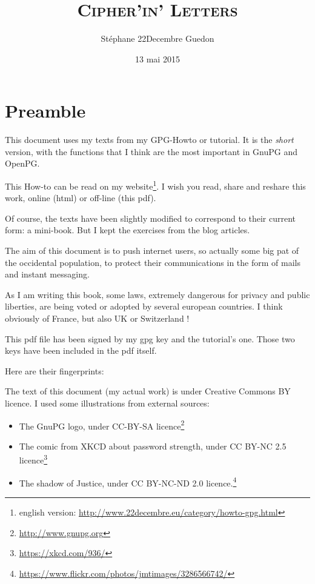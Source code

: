 \documentclass[10pt,a4paper,openany]{book}
\title{\scshape Cipher'in' Letters}
\author{Stéphane 22Decembre Guedon}
\date{13 mai 2015}
\begin{document}
	\maketitle

	\chapter{Preamble}
	
	This document uses my texts from my GPG-Howto or tutorial. It is the \textit{short} version, with the functions that I think are the most important in GnuPG and OpenPG.
	
	This How-to can be read on my website\footnote{english version: \url{http://www.22decembre.eu/category/howto-gpg.html}}. I wish you read, share and reshare this work, online (html) or off-line (this pdf).
	
	Of course, the texts have been slightly modified to correspond to their current form: a mini-book. But I kept the exercises from the blog articles.
	
	The aim of this document is to push internet users, so actually some big pat of the occidental population, to protect their communications in the form of mails and instant messaging.
	
	As I am writing this book, some laws, extremely dangerous for privacy and public liberties, are being voted or adopted by several european countries. I think obviously of France, but also UK or Switzerland !
	
	This pdf file has been signed by my gpg key and the tutorial's one. Those two keys have been included in the pdf itself.
	
	Here are their fingerprints:
	
	\begin{center}
	\end{center}
	\begin{center}
	\end{center}
	
	The text of this document (my actual work) is under Creative Commons BY licence. I used some illustrations from external sources:
	\begin{itemize}
		\item The GnuPG logo, under CC-BY-SA licence\footnote{\url{http://www.gnupg.org}}
		\item The comic from XKCD about password strength, under CC BY-NC 2.5 licence\footnote{\url{https://xkcd.com/936/}}
		\item The shadow of Justice, under CC BY-NC-ND 2.0 licence.\footnote{\url{https://www.flickr.com/photos/jmtimages/3286566742/}}
	\end{itemize}
	
\end{document}
